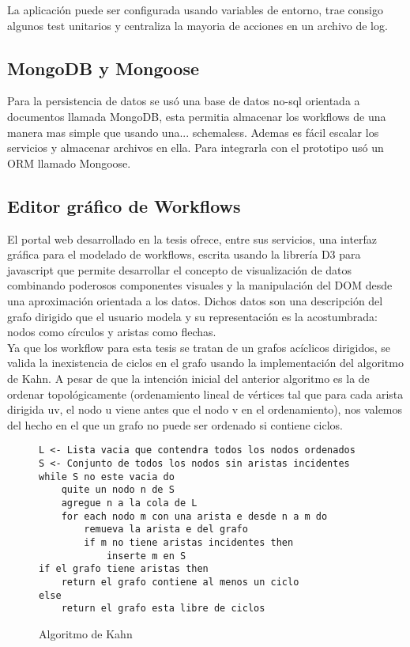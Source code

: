 La aplicación puede ser configurada usando variables de entorno, trae consigo algunos test unitarios y centraliza la mayoria de acciones en un archivo de log.

\subsection{MongoDB y Mongoose}
Para la persistencia de datos se usó una base de datos no-sql orientada a documentos llamada MongoDB, esta permitia almacenar los workflows de una manera mas simple que usando una... schemaless. Ademas es fácil escalar los servicios y almacenar archivos en ella. Para integrarla con el prototipo usó un ORM llamado Mongoose.

\subsection{Editor gráfico de Workflows}
El portal web desarrollado en la tesis ofrece, entre sus servicios, una interfaz gráfica \cite{digraph} para el modelado de workflows, escrita usando la librería D3 para javascript que permite desarrollar el concepto de visualización de datos combinando poderosos componentes visuales y la manipulación del DOM desde una aproximación orientada a los datos. Dichos datos son una descripción del grafo dirigido que el usuario modela y su representación es la acostumbrada: nodos como círculos y aristas como flechas.\\

Ya que los workflow para esta tesis se tratan de un grafos acíclicos dirigidos, se valida la inexistencia de ciclos  en el grafo usando la implementación del algoritmo de Kahn. A pesar de que la intención inicial del anterior algoritmo es la de ordenar topológicamente (ordenamiento lineal de vértices tal que para cada arista dirigida uv, el nodo u viene antes que el nodo v en el ordenamiento), nos valemos del hecho en el que un grafo no puede ser ordenado si contiene ciclos.

\begin{figure}
\begin{lstlisting}
L <- Lista vacia que contendra todos los nodos ordenados
S <- Conjunto de todos los nodos sin aristas incidentes
while S no este vacia do
    quite un nodo n de S
    agregue n a la cola de L
    for each nodo m con una arista e desde n a m do
        remueva la arista e del grafo
        if m no tiene aristas incidentes then
            inserte m en S
if el grafo tiene aristas then
    return el grafo contiene al menos un ciclo
else
    return el grafo esta libre de ciclos
\end{lstlisting}
\caption{Algoritmo de Kahn}
\end{figure}

